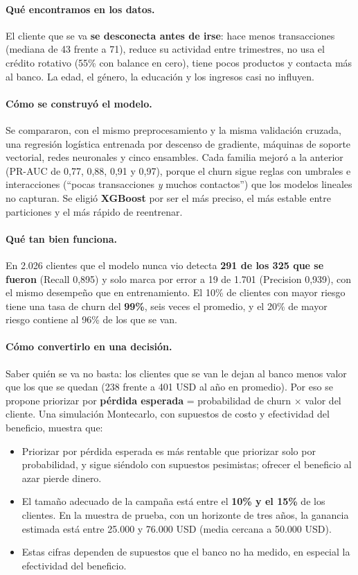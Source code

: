 \documentclass[11pt,a4paper]{article}
\begin{document}
\paragraph{Qué encontramos en los datos.} El cliente que se va \textbf{se desconecta antes de irse}: hace menos transacciones (mediana de 43 frente a 71), reduce su actividad entre trimestres, no usa el crédito rotativo (55\% con balance en cero), tiene pocos productos y contacta más al banco. La edad, el género, la educación y los ingresos casi no influyen.

\paragraph{Cómo se construyó el modelo.} Se compararon, con el mismo preprocesamiento y la misma validación cruzada, una regresión logística entrenada por descenso de gradiente, máquinas de soporte vectorial, redes neuronales y cinco ensambles. Cada familia mejoró a la anterior (PR-AUC de 0,77, 0,88, 0,91 y 0,97), porque el churn sigue reglas con umbrales e interacciones (``pocas transacciones \emph{y} muchos contactos'') que los modelos lineales no capturan. Se eligió \textbf{XGBoost} por ser el más preciso, el más estable entre particiones y el más rápido de reentrenar.

\paragraph{Qué tan bien funciona.} En 2.026 clientes que el modelo nunca vio detecta \textbf{291 de los 325 que se fueron} (Recall 0,895) y solo marca por error a 19 de 1.701 (Precision 0,939), con el mismo desempeño que en entrenamiento. El 10\% de clientes con mayor riesgo tiene una tasa de churn del \textbf{99\%}, seis veces el promedio, y el 20\% de mayor riesgo contiene al 96\% de los que se van.

\paragraph{Cómo convertirlo en una decisión.} Saber quién se va no basta: los clientes que se van le dejan al banco menos valor que los que se quedan (238 frente a 401 USD al año en promedio). Por eso se propone priorizar por \textbf{pérdida esperada} = probabilidad de churn $\times$ valor del cliente. Una simulación Montecarlo, con supuestos de costo y efectividad del beneficio, muestra que:
\begin{itemize}
  \item Priorizar por pérdida esperada es más rentable que priorizar solo por probabilidad, y sigue siéndolo con supuestos pesimistas; ofrecer el beneficio al azar pierde dinero.
  \item El tamaño adecuado de la campaña está entre el \textbf{10\% y el 15\%} de los clientes. En la muestra de prueba, con un horizonte de tres años, la ganancia estimada está entre 25.000 y 76.000 USD (media cercana a 50.000 USD).
  \item Estas cifras dependen de supuestos que el banco no ha medido, en especial la efectividad del beneficio.
\end{itemize}
\end{document}
